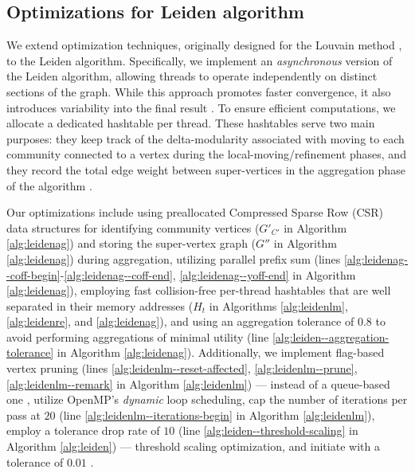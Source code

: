 \subsection{Optimizations for Leiden algorithm}
\label{sec:leiden}

We extend optimization techniques, originally designed for the Louvain method \cite{sahu2023gvelouvain}, to the Leiden algorithm. Specifically, we implement an \textit{asynchronous} version of the Leiden algorithm, allowing threads to operate independently on distinct sections of the graph. While this approach promotes faster convergence, it also introduces variability into the final result \cite{com-shi21}. To ensure efficient computations, we allocate a dedicated hashtable per thread. These hashtables serve two main purposes: they keep track of the delta-modularity associated with moving to each community connected to a vertex during the local-moving/refinement phases, and they record the total edge weight between super-vertices in the aggregation phase of the algorithm \cite{sahu2023gvelouvain}.

Our optimizations include using preallocated Compressed Sparse Row (CSR) data structures for identifying community vertices ($G'_{C'}$ in Algorithm \ref{alg:leidenag}) and storing the super-vertex graph ($G''$ in Algorithm \ref{alg:leidenag}) during aggregation, utilizing parallel prefix sum (lines \ref{alg:leidenag--coff-begin}-\ref{alg:leidenag--coff-end}, \ref{alg:leidenag--yoff-end} in Algorithm \ref{alg:leidenag}), employing fast collision-free per-thread hashtables that are well separated in their memory addresses ($H_t$ in Algorithms \ref{alg:leidenlm}, \ref{alg:leidenre}, and \ref{alg:leidenag}), and using an aggregation tolerance of $0.8$ to avoid performing aggregations of minimal utility (line \ref{alg:leiden--aggregation-tolerance} in Algorithm \ref{alg:leidenag}). Additionally, we implement flag-based vertex pruning (lines \ref{alg:leidenlm--reset-affected}, \ref{alg:leidenlm--prune}, \ref{alg:leidenlm--remark} in Algorithm \ref{alg:leidenlm}) --- instead of a queue-based one \cite{nguyenleiden}, utilize OpenMP's \textit{dynamic} loop scheduling, cap the number of iterations per pass at $20$ (line \ref{alg:leidenlm--iterations-begin} in Algorithm \ref{alg:leidenlm}), employ a tolerance drop rate of $10$ (line \ref{alg:leiden--threshold-scaling} in Algorithm \ref{alg:leiden}) --- threshold scaling optimization, and initiate with a tolerance of $0.01$ \cite{sahu2023gvelouvain}.

